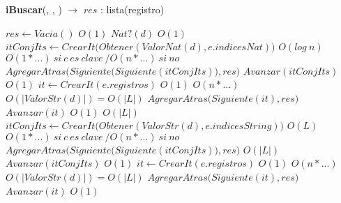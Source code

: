 \begin{Algoritmos}
\begin{algorithm}[H]{\textbf{iBuscar}(, , ) $\to$ $res$ : lista(registro)}
  \begin{algorithmic}
    \State $res \gets Vacia()$ \Comment $O(1)$
    \If $Nat?(d)$ \Comment $O(1)$
       
         
          \State $itConjIts \gets CrearIt\big(Obtener(ValorNat(d), e.indicesNat)\big)$ \Comment $O(log\ n)$
           \Comment $O(1 * ...)\ si\ c\ es\ clave\ / O(n * ...)\ si\ no$
            \State $AgregarAtras\big(Siguiente\big(Siguiente(itConjIts)\big), res\big)$ 
            \State $Avanzar(itConjIts)$ \Comment $O(1)$
          \EndWhile
        \EndIf
      \Else
        \State $it \gets CrearIt(e.registros)$ \Comment $O(1)$
         \Comment $O(n * ...)$
           \Comment $O(|ValorStr(d)|) = O(|L|)$
            \State $AgregarAtras\big(Siguiente(it), res\big)$
          \EndIf
          \State $Avanzar(it)$ \Comment $O(1)$
        \EndWhile
      \EndIf
    \Else
       
         \Comment$O(|L|)$
          \State $itConjIts \gets CrearIt\big(Obtener(ValorStr(d), e.indicesString)\big)$ \Comment $O(L)$
           \Comment $O(1 * ...)\ si\ c\ es\ clave\ / O(n * ...)\ si\ no$
            \State $AgregarAtras\big(Siguiente\big(Siguiente(itConjIts)\big), res\big)$ \Comment$O(|L|)$
            \State $Avanzar(itConjIts)$ \Comment $O(1)$
          \EndWhile
        \EndIf
      \Else
        \State $it \gets CrearIt(e.registros)$ \Comment $O(1)$
         \Comment $O(n * ...)$
           \Comment $O(|ValorStr(d)|) = O(|L|)$
            \State $AgregarAtras\big(Siguiente(it), res\big)$
          \EndIf
          \State $Avanzar(it)$ \Comment $O(1)$
        \EndWhile
      \EndIf
    \EndIf



\end{algorithmic}
\end{algorithm}
\end{Algoritmos}
